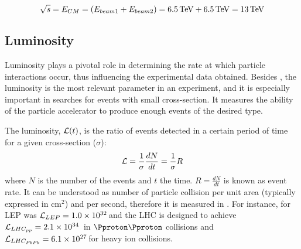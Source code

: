 \begin{equation}
	\sqrt{s} = E_{CM} = (E_{beam1} + E_{beam2}) = 6.5\,\textrm{TeV} + 6.5\,\textrm{TeV} = 13\,\textrm{TeV}
\end{equation}

\begin{comment}
When LHC is used for fix target experiments, one of the particles in the collision is at rest ($\momentum_2 = 0$) and the Eq. \ref{eq:Chap2:EnergyGeneral}
writes as:
\begin{equation}
	E^{2}_{CM} = (m_{1}^2 +m_{2^2 } + 2m_{2}E_{1,lab})
\end{equation}
Then, the energy for a $\Pproton \Pproton$ fix target collision with one beam at $650\,$GeV is
\begin{equation}
\begin{split}
	E^{2}_{CM} 	&= (m_{p}^2  +m_{p}^2  + 2m_{p}E_{beam}) \\
				&= 2(0.938\,\textrm{GeV})^2 + 2\cdot0.938\,\textrm{GeV} \cdot 650\,\textrm{GeV} = 1221.2\,\textrm{GeV}^2\\
	E_{CM}		&= 34.9\,\textrm{GeV}
\end{split}
\end{equation}
This shows why colliding beams are essential to achieve high center of mass energies.
\end{comment}

\subsection{Luminosity}
\label{sec:Chap1:LHC:Cross-Luminosity}
Luminosity plays a pivotal role in determining the rate at which particle interactions occur, 
thus influencing the experimental data obtained.
Besides \CM, the luminosity is the most relevant parameter in an experiment,  and it is especially 
important in searches for events with small cross-section.
It measures the ability of the particle accelerator to produce enough events of the desired type.

The luminosity, $\mathcal{L}(t)$, is the ratio of events detected in a certain period of time for a given cross-section ($\sigma$):
\begin{equation}
\mathcal{L} = \frac{1}{\sigma}\frac{dN}{dt} = \frac{1}{\sigma} R
\end{equation}
where $N$ is the number of the events and $t$ the time. $R=\frac{dN}{dt}$ is known as event rate. It can be understood as number of 
particle collision per unit area (typically expressed in cm$^2$) and per second, therefore it is measured in \lumiunits \cite{Herr:941318}.  
For instance, for LEP was $\mathcal{L}_{LEP}=1.0\times10^{32}\,$\lumiunits and the LHC is designed to achieve $\mathcal{L}_{LHC_{pp}}=2.1\times10^{34}\,$\lumiunits 
in $\Pproton\Pproton$ collisions and $\mathcal{L}_{LHC_{PbPb}}=6.1\times10^{27}\,$\lumiunits for heavy ion collisions.

